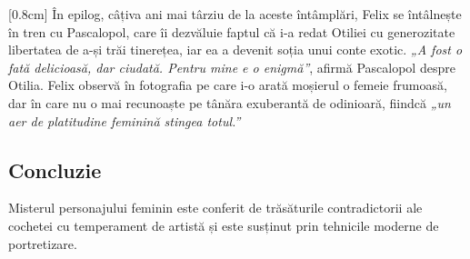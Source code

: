 [0.8cm]
În epilog, câțiva ani mai târziu de la aceste întâmplări, Felix se întâlnește în tren cu Pascalopol, care îi dezvăluie faptul că i-a redat Otiliei cu generozitate libertatea de a-și trăi tinerețea, iar ea a devenit soția unui conte exotic. \textit{„A fost o fată delicioasă, dar ciudată. Pentru mine e o enigmă”}, afirmă Pascalopol despre Otilia. Felix observă în fotografia pe care i-o arată moșierul o femeie frumoasă, dar în care nu o mai recunoaște pe tânăra exuberantă de odinioară, fiindcă \textit{„un aer de platitudine feminină stingea totul.”}


\subsection{Concluzie}

Misterul personajului feminin este conferit de trăsăturile contradictorii ale cochetei cu temperament de artistă și este susținut prin tehnicile moderne de portretizare.
